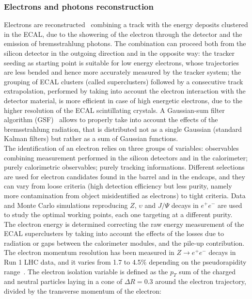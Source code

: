 \subsubsection{Electrons and photons reconstruction}
Electrons are reconstructed~\cite{Chatrchyan:2013dga} combining a track with the energy deposits clustered in the ECAL, due to the showering of the electron through the detector and the emission of bremsstrahlung photons. The combination can proceed both from the silicon detector in the outgoing direction and in the opposite way: the tracker seeding as starting point is suitable for low energy electrons, whose trajectories are less bended and hence more accurately measured by the tracker system; the grouping of ECAL clusters (called superclusters) followed by a consecutive track extrapolation, performed by taking into account the electron interaction with the detector material, is more efficient in case of high energetic electrons, due to the higher resolution of the ECAL scintillating crystals. A Gaussian-sum filter algorithm (GSF)~\cite{Adam:2005bya} allows to properly take into account the effects of the bremsstrahlung radiation, that is distributed not as a single Gaussian (standard Kalman filters) but rather as a sum of Gaussian functions.\\
The identification of an electron relies on three groups of variables: observables combining measurement performed in the silicon detectors and in the calorimeter; purely calorimetric observables; purely tracking informations. Different selections are used for electron candidates found in the barrel and in the endcaps, and they can vary from loose criteria (high detection efficiency but less purity, namely more contamination from object misidentified as electrons) to tight criteria. Data and Monte Carlo simulations reproducing $Z$, $\upsilon$ and $J/\Psi$ decays in $e^+ e^-$ are used to study the optimal working points, each one targeting at a different purity.\\
The electron energy is determined correcting the raw energy measurement of the ECAL superclusters by taking into account the effects of the losses due to radiation or gaps between the calorimeter modules, and the pile-up contribution. The electron momentum resolution has been measured in $Z \rightarrow e^+ e^-$ decays in Run 1 LHC data, and it varies from 1.7 to 4.5\% depending on the pseudorapidity range~\cite{Khachatryan:2015hwa}.%
The electron isolation variable is defined as the $p_T$ sum of the charged and neutral particles laying in a cone of $\Delta R = 0.3$ around the electron trajectory, divided by the transverse momentum of the electron:
